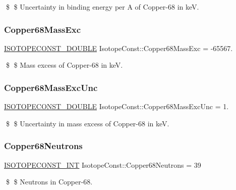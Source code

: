 \$ \$ Uncertainty in binding energy per A of Copper-\/68 in keV. \mbox{\label{group___isotope_const-_copper-_cu68_gac6274d90ee75ad24d5b6bc9602534929}} 
\subsubsection{\texorpdfstring{Copper68\+Mass\+Exc}{Copper68MassExc}}
{\footnotesize\ttfamily \mbox{\hyperlink{group___isotope_const-_macros_ga8f45a7272ce02c0b4c65c44636ed719a}{I\+S\+O\+T\+O\+P\+E\+C\+O\+N\+S\+T\+\_\+\+D\+O\+U\+B\+LE}} Isotope\+Const\+::\+Copper68\+Mass\+Exc = -\/65567.}

\$ \$ Mass excess of Copper-\/68 in keV. \mbox{\label{group___isotope_const-_copper-_cu68_ga8b1440769e43ace1d7957c9c24912a16}} 
\subsubsection{\texorpdfstring{Copper68\+Mass\+Exc\+Unc}{Copper68MassExcUnc}}
{\footnotesize\ttfamily \mbox{\hyperlink{group___isotope_const-_macros_ga8f45a7272ce02c0b4c65c44636ed719a}{I\+S\+O\+T\+O\+P\+E\+C\+O\+N\+S\+T\+\_\+\+D\+O\+U\+B\+LE}} Isotope\+Const\+::\+Copper68\+Mass\+Exc\+Unc = 1.}

\$ \$ Uncertainty in mass excess of Copper-\/68 in keV. \mbox{\label{group___isotope_const-_copper-_cu68_gaccfd1a8d5931061edc3609d51a0ab989}} 
\subsubsection{\texorpdfstring{Copper68\+Neutrons}{Copper68Neutrons}}
{\footnotesize\ttfamily \mbox{\hyperlink{group___isotope_const-_macros_ga5f18360b3e99483a35c32d789e62621c}{I\+S\+O\+T\+O\+P\+E\+C\+O\+N\+S\+T\+\_\+\+I\+NT}} Isotope\+Const\+::\+Copper68\+Neutrons = 39}

\$ \$ Neutrons in Copper-\/68. \mbox{\label{group___isotope_const-_copper-_cu68_gad04faa3fa5b20b88d2f0141c02b74e4e}} 
